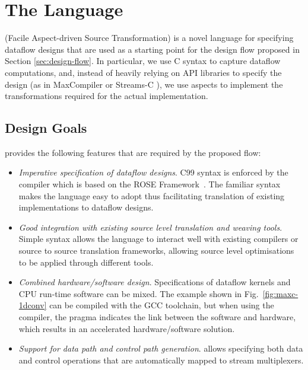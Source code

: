 \chapter{The \FAST{} Language}
\label{sec:fast}

\FAST{} (Facile Aspect-driven Source Transformation) is a novel
language for specifying dataflow designs that are used as a starting
point for the design flow proposed in Section
\ref{sec:design-flow}. In particular, we use C syntax to capture
dataflow computations, and, instead of heavily relying on API libraries
to specify the design (as in MaxCompiler \cite{5719584} or Streams-C
\cite{Gokhale:Stone:Arnold:Kalinowski:2000}), we use aspects to
implement the transformations required for the actual implementation.

\section{Design Goals}

\FAST{} provides the following features that are
required by the proposed flow:

\begin{itemize}
\item \emph{Imperative specification of dataflow designs}. C99 syntax
  is enforced by the \FAST{} compiler which is based on the ROSE
  Framework~\cite{Quinlan:2000}. The familiar syntax makes the
  language easy to adopt thus facilitating translation of existing
  implementations to dataflow designs.
\item \emph{Good integration with existing source level translation and
  weaving tools}. Simple syntax allows the language to interact well
  with existing compilers or source to source translation frameworks,
  allowing source level optimisations to be applied through different
  tools.
\item \emph{Combined hardware/software design}. Specifications of dataflow
  kernels and CPU run-time software can be mixed. The example shown in
  Fig.~\ref{fig:maxc-1dconv} can be compiled with the GCC toolchain,
  but when using the \FAST{} compiler, the pragma indicates the link
  between the software and hardware, which results in an accelerated
  hardware/software solution.
\item \emph{Support for data path and control path generation}. \FAST{}
  allows specifying both data and control operations that are
  automatically mapped to stream multiplexers.
\end{itemize}

